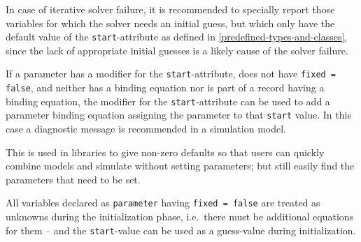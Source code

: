 \begin{nonnormative}
In case of iterative solver failure, it is recommended to specially report those variables for which the solver needs an initial guess, but which only have the default value of the \lstinline!start!-attribute as defined in \cref{predefined-types-and-classes}, since the lack of appropriate initial guesses is a likely cause of the solver failure.
\end{nonnormative}

If a parameter has a modifier for the \lstinline!start!-attribute, does not have \lstinline!fixed = false!, and neither has a binding equation nor is part of a record having a binding equation, the modifier for the \lstinline!start!-attribute can be used to add a parameter binding equation assigning the parameter to that \lstinline!start! value.
In this case a diagnostic message is recommended in a simulation model.

\begin{nonnormative}
This is used in libraries to give non-zero defaults so that users can quickly combine models and simulate without setting parameters; but still easily find the parameters
that need to be set.
\end{nonnormative}

All variables declared as \lstinline!parameter! having \lstinline!fixed = false! are treated as unknowns during the initialization phase, i.e.\ there must be additional equations for them -- and
the \lstinline!start!-value can be used as a guess-value during initialization.

